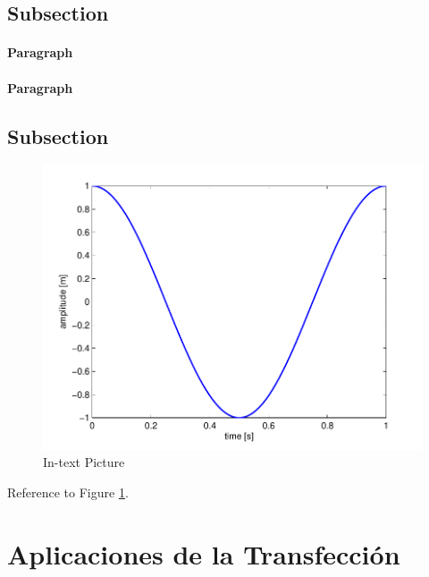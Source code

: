 \documentclass[fleqn,10pt]{SelfArx} %
\begin{document}
\subsection{Subsection}



\paragraph{Paragraph} %
\paragraph{Paragraph} %

\subsection{Subsection}



\begin{figure}[ht]\centering
\includegraphics[width=\linewidth]{images/results}
\caption{In-text Picture}
\label{fig:results}
\end{figure}

Reference to Figure \ref{fig:results}.


\section{Aplicaciones de la Transfección}
\end{document}
